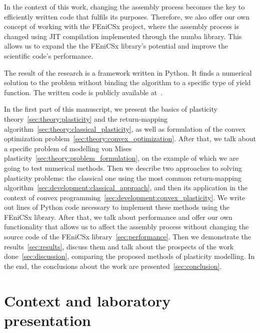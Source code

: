 \documentclass[12pt]{article}
\begin{document}
In the context of this work, changing the assembly process becomes the key to efficiently written code that fulfils its purposes. Therefore, we also offer our own concept of working with the FEniCSx project, where the assembly process is changed using JIT compilation implemented through the numba library. This allows us to expand the the FEniCSx library's potential and improve the scientific code's performance.

The result of the research is a framework written in Python. It finds a numerical solution to the problem without binding the algorithm to a specific type of yield function. The written code is publicly available at~\parencite{convex-plasticity}. 

In the first part of this manuscript, we present the basics of plasticity theory~\eqref{sec:theory:plasticity} and the return-mapping algorithm~\eqref{sec:theory:classical_plasticity}, as well as formulation of the convex optimization problem~\eqref{sec:theory:convex_optimization}. After that, we talk about a specific problem of modelling von Mises plasticity~\eqref{sec:theory:problem_formulation}, on the example of which we are going to test numerical methods. Then we describe two approaches to solving plasticity problems: the classical one using the most common return-mapping algorithm~\eqref{sec:development:classical_approach}, and then its application in the context of convex programming~\eqref{sec:development:convex_plasticity}. We write out lines of Python code necessary to implement these methods using the FEniCSx library. After that, we talk about performance and offer our own functionality that allows us to affect the assembly process without changing the source code of the FEniCSx library~\eqref{sec:performance}. Then we demonstrate the results~\eqref{sec:results}, discuss them and talk about the prospects of the work done~\eqref{sec:discussion}, comparing the proposed methods of plasticity modelling. In the end, the conclusions about the work are presented~\eqref{sec:conclusion}.

\newpage
\section{Context and laboratory presentation}
\end{document}
